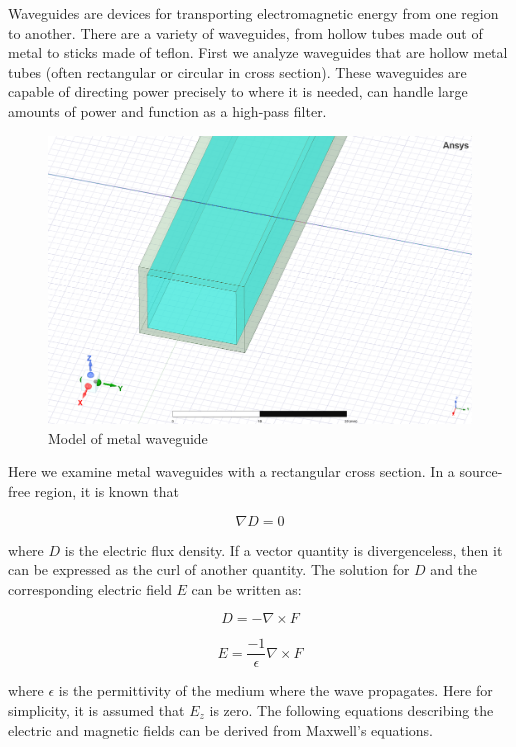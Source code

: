 \documentclass[a4paper,12pt]{report}
\begin{document}
Waveguides are devices for transporting electromagnetic energy
from one region to another.
There are a variety of waveguides, from hollow tubes made out of metal to
sticks made of teflon.
First we analyze waveguides that are hollow metal tubes
(often rectangular or circular in cross section).
These waveguides are capable of directing power precisely to where it is needed,
can handle large amounts of power and function as a high-pass filter.

\begin{figure}
  \begin{center}
    \includegraphics[clip, keepaspectratio, width=0.5\linewidth]{img/metal_waveguide.png}
    \caption{Model of metal waveguide}
    \label{fig:metal_waveguide}
  \end{center}
\end{figure}

Here we examine metal waveguides with a rectangular cross section.
In a source-free region, it is known that

\begin{equation}
  \nabla D = 0
\end{equation}

where $D$ is the electric flux density.
If a vector quantity is divergenceless,
then it can be expressed as the curl of another quantity.
The solution for $D$ and the corresponding electric field $E$
can be written as:

\begin{equation}
  D = -\nabla \times F
\end{equation}

\begin{equation}
  E = \frac{-1}{\epsilon}\nabla \times F
\end{equation}

where $\epsilon$ is the permittivity of the medium where the wave propagates.
Here for simplicity, it is assumed that $E_z$ is zero.
The following equations describing the electric and magnetic fields can be derived from Maxwell's equations.
\end{document}
